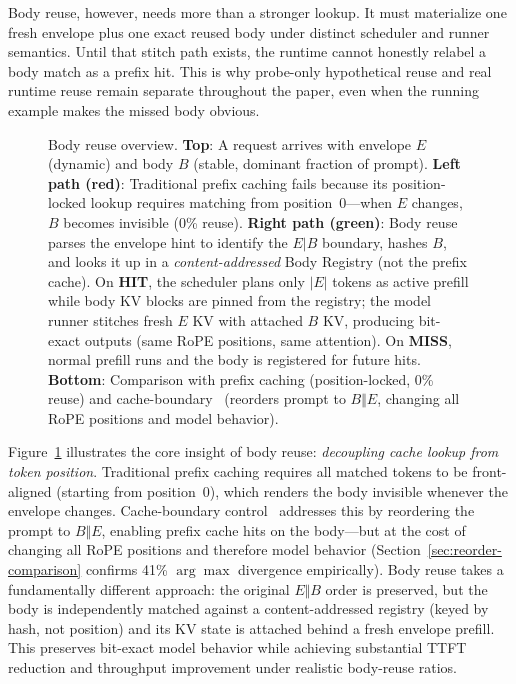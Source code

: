 \documentclass[conference]{IEEEtran}
\begin{document}
Body reuse, however, needs more than a stronger lookup. It must materialize one fresh envelope plus one exact reused body under distinct scheduler and runner semantics. Until that stitch path exists, the runtime cannot honestly relabel a body match as a prefix hit. This is why probe-only hypothetical reuse and real runtime reuse remain separate throughout the paper, even when the running example makes the missed body obvious.

\begin{figure}[t]
\centering
{}
\caption{Body reuse overview. \textbf{Top}: A request arrives with envelope $E$ (dynamic) and body $B$ (stable, dominant fraction of prompt). \textbf{Left path (red)}: Traditional prefix caching fails because its position-locked lookup requires matching from position~0---when $E$ changes, $B$ becomes invisible (0\% reuse). \textbf{Right path (green)}: Body reuse parses the envelope hint to identify the $E|B$ boundary, hashes $B$, and looks it up in a \emph{content-addressed} Body Registry (not the prefix cache). On \textbf{HIT}, the scheduler plans only $|E|$ tokens as active prefill while body KV blocks are pinned from the registry; the model runner stitches fresh $E$ KV with attached $B$ KV, producing bit-exact outputs (same RoPE positions, same attention). On \textbf{MISS}, normal prefill runs and the body is registered for future hits. \textbf{Bottom}: Comparison with prefix caching (position-locked, 0\% reuse) and cache-boundary~\cite{lumer2026dontbreak} (reorders prompt to $B \Vert E$, changing all RoPE positions and model behavior).}
\label{fig:body-reuse-overview}
\end{figure}

Figure~\ref{fig:body-reuse-overview} illustrates the core insight of body reuse: \emph{decoupling cache lookup from token position}. Traditional prefix caching requires all matched tokens to be front-aligned (starting from position~0), which renders the body invisible whenever the envelope changes. Cache-boundary control~\cite{lumer2026dontbreak} addresses this by reordering the prompt to $B \Vert E$, enabling prefix cache hits on the body---but at the cost of changing all RoPE positions and therefore model behavior (Section~\ref{sec:reorder-comparison} confirms 41\% $\arg\max$ divergence empirically). Body reuse takes a fundamentally different approach: the original $E \Vert B$ order is preserved, but the body is independently matched against a content-addressed registry (keyed by hash, not position) and its KV state is attached behind a fresh envelope prefill. This preserves bit-exact model behavior while achieving substantial TTFT reduction and throughput improvement under realistic body-reuse ratios.
\end{document}
